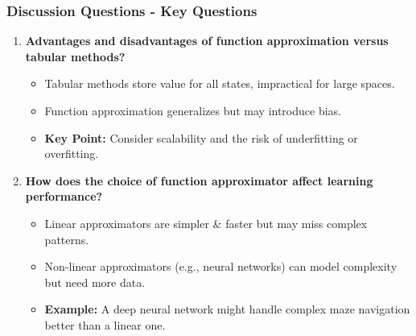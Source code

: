 \documentclass[aspectratio=169]{beamer}
\begin{document}
\begin{frame}[fragile]
    \frametitle{Discussion Questions - Key Questions}
    \begin{enumerate}
        \item \textbf{Advantages and disadvantages of function approximation versus tabular methods?}
        \begin{itemize}
            \item Tabular methods store value for all states, impractical for large spaces.
            \item Function approximation generalizes but may introduce bias.
            \item \textbf{Key Point:} Consider scalability and the risk of underfitting or overfitting.
        \end{itemize}
        
        \item \textbf{How does the choice of function approximator affect learning performance?}
        \begin{itemize}
            \item Linear approximators are simpler & faster but may miss complex patterns.
            \item Non-linear approximators (e.g., neural networks) can model complexity but need more data.
            \item \textbf{Example:} A deep neural network might handle complex maze navigation better than a linear one.
        \end{itemize}
    \end{enumerate}
\end{frame}
\end{document}
